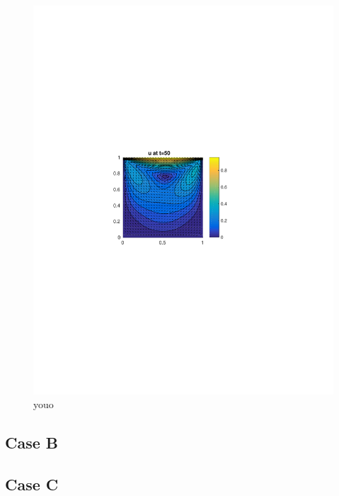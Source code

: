 \documentclass[10pt,a4paper]{article}
\begin{document}
\begin{figure}
\begin{minipage}{.5\textwidth}
  \includegraphics[width=.9\linewidth]{Part1_Case_A_Velocity.pdf}
\end{minipage}
\caption{youo}
\end{figure}


\subsection{Case B}

\subsection{Case C}

\newpage
\end{document}
